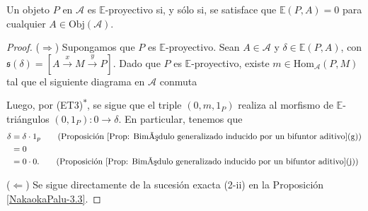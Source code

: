 \documentclass[tesis]{subfiles}
\begin{document}
\begin{Prop}\cite[Proposition 3.24]{NakaokaPalu}\label{NakaokaPalu-3.24}
    Un objeto $P$ en $\mathscr{A}$ es $\mathbb{E}$-proyectivo si, y sólo si, se satisface que $\mathbb{E}(P,A)=0$ para cualquier $A\in\text{Obj}(\mathscr{A})$.
\end{Prop}

\begin{proof}\leavevmode
    ($\Rightarrow$) Supongamos que $P$ es $\mathbb{E}$-proyectivo. Sean $A\in\mathscr{A}$ y $\delta\in\mathbb{E}(P,A)$, con $\mathfrak{s}(\delta) = [A\xrightarrow[]{x}M\xrightarrow[]{y}P]$. Dado que $P$ es $\mathbb{E}$-proyectivo, existe $m\in\text{Hom}_\mathscr{A}(P,M)$ tal que el siguiente diagrama en $\mathscr{A}$ conmuta
    \begin{center}
    \end{center}
    Luego, por (ET3)\textsuperscript{$\ast$}, se sigue que el triple $(0,m,1_P)$ realiza al morfismo de $\mathbb{E}$-triángulos $(0,1_P):0\to \delta$. En particular, tenemos que
    \begin{align*}
        \delta &= \delta\cdot 1_p \tag{Proposición \ref{Prop: Bimódulo generalizado inducido por un bifuntor aditivo}(g)} \\
               &= 0 \\
               &= 0\cdot0. \tag{Proposición \ref{Prop: Bimódulo generalizado inducido por un bifuntor aditivo}(j)} \\
    \end{align*}

    ($\Leftarrow$) Se sigue directamente de la sucesión exacta (2-ii) en la Proposición \ref{NakaokaPalu-3.3}.
\end{proof}
\end{document}
